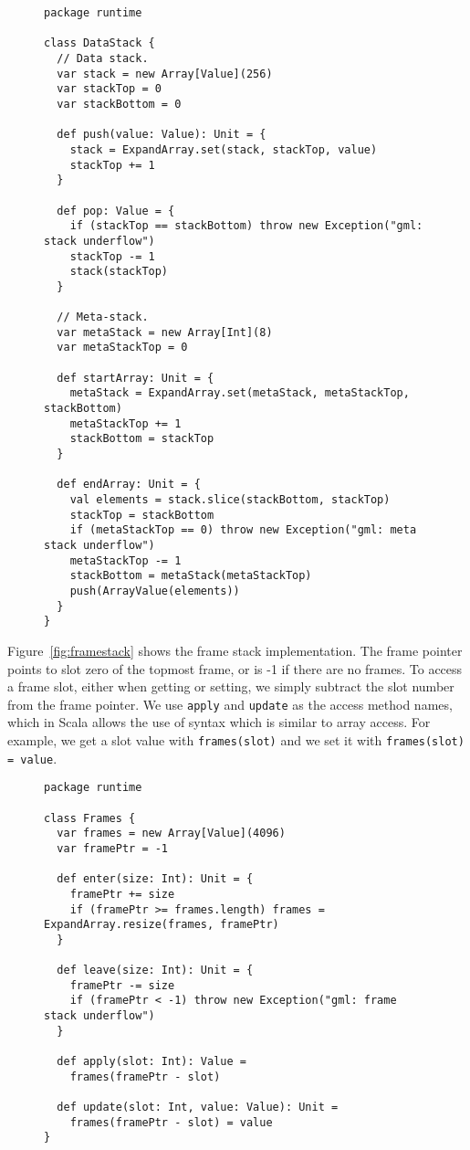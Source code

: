 \begin{figure}
\begin{verbatim}
package runtime

class DataStack {
  // Data stack.
  var stack = new Array[Value](256)
  var stackTop = 0
  var stackBottom = 0

  def push(value: Value): Unit = {
    stack = ExpandArray.set(stack, stackTop, value)
    stackTop += 1
  }

  def pop: Value = {
    if (stackTop == stackBottom) throw new Exception("gml: stack underflow")
    stackTop -= 1
    stack(stackTop)
  }

  // Meta-stack.
  var metaStack = new Array[Int](8)
  var metaStackTop = 0

  def startArray: Unit = {
    metaStack = ExpandArray.set(metaStack, metaStackTop, stackBottom)
    metaStackTop += 1
    stackBottom = stackTop
  }

  def endArray: Unit = {
    val elements = stack.slice(stackBottom, stackTop)
    stackTop = stackBottom
    if (metaStackTop == 0) throw new Exception("gml: meta stack underflow")
    metaStackTop -= 1
    stackBottom = metaStack(metaStackTop)
    push(ArrayValue(elements))
  }
}
\end{verbatim}
\getcaption
\end{figure}

Figure~\ref{fig:framestack} shows the frame stack implementation.
The frame pointer points to slot zero of the topmost frame,
or is -1 if there are no frames.
To access a frame slot,
either when getting or setting,
we simply subtract the slot number from the frame pointer.
We use \verb!apply! and \verb!update! as the access method names,
which in Scala allows the use of syntax which is similar to array access.
For example, we get a slot value with \verb!frames(slot)!
and we set it with \verb!frames(slot) = value!.

\begin{figure}
\begin{verbatim}
package runtime

class Frames {
  var frames = new Array[Value](4096)
  var framePtr = -1

  def enter(size: Int): Unit = {
    framePtr += size
    if (framePtr >= frames.length) frames = ExpandArray.resize(frames, framePtr)
  }

  def leave(size: Int): Unit = {
    framePtr -= size
    if (framePtr < -1) throw new Exception("gml: frame stack underflow")
  }

  def apply(slot: Int): Value =
    frames(framePtr - slot)

  def update(slot: Int, value: Value): Unit =
    frames(framePtr - slot) = value
}
\end{verbatim}
\getcaption
\end{figure}

